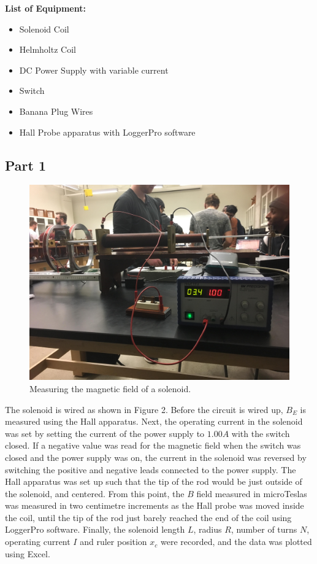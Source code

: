 \documentclass[letterpaper]{article}
\begin{document}


\textbf{List of Equipment:}
\begin{itemize}
  \item Solenoid Coil
  \item Helmholtz Coil
  \item DC Power Supply with variable current
  \item Switch
  \item Banana Plug Wires
  \item Hall Probe apparatus with LoggerPro software
\end{itemize}

\subsection{Part 1}

\begin{figure}[H]
    \centering
    \includegraphics[width=.6\textwidth]{p1-1.jpg}
    \caption{Measuring the magnetic field of a solenoid.}
\end{figure}

The solenoid is wired as shown in Figure 2. Before the circuit is wired up,
$B_E$ is measured using the Hall apparatus. Next, the operating current in the solenoid
was set by setting the current of the power supply to $1.00 A$ with the switch closed.
If a negative value was read for the magnetic field when the switch was
closed and the power supply was on, the current in the solenoid was reversed by switching the
positive and negative leads connected to the power supply. The Hall apparatus
was set up such that the tip of the rod would be just outside of the solenoid,
and centered. From this point, the $B$ field measured in microTeslas was measured
in two centimetre increments as the Hall probe was moved inside the coil, until the
tip of the rod just barely reached the end of the coil using LoggerPro software.
Finally, the solenoid length $L$, radius $R$, number of turns $N$, operating current $I$
and ruler position $x_c$ were recorded, and the data was plotted using Excel.
\end{document}
